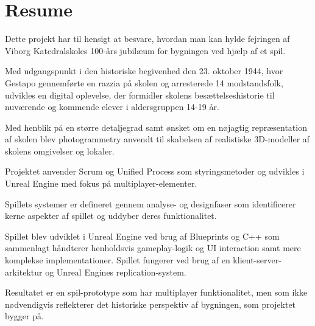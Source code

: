     \section{Resume}

    \begin{itshape}
    Dette projekt har til hensigt at besvare, hvordan man kan hylde fejringen af Viborg Katedralskoles 100-års jubilæum for bygningen ved hjælp af et spil. 
    
    Med udgangspunkt i den historiske begivenhed den 23. oktober 1944, hvor Gestapo gennemførte en razzia på skolen og arresterede 14 modstandsfolk, udvikles en digital oplevelse, der formidler skolens besættelseshistorie til nuværende og kommende elever i aldersgruppen 14-19 år. 
    
    Med henblik på en større detaljegrad samt ønsket om en nøjagtig repræsentation af skolen blev photogrammetry anvendt til skabelsen af realistiske 3D-modeller af skolens omgivelser og lokaler. 

    Projektet anvender Scrum og Unified Process som styringsmetoder og udvikles i Unreal Engine med fokus på multiplayer-elementer. 
    
    Spillets systemer er defineret gennem analyse- og designfaser som identificerer kerne aspekter af spillet og uddyber deres funktionalitet. 

    Spillet blev udviklet i Unreal Engine ved brug af Blueprints og C++ som sammenlagt håndterer henholdsvis gameplay-logik og UI interaction samt mere komplekse implementationer.  Spillet fungerer ved brug af en klient-server-arkitektur og Unreal Engines replication-system. 

    Resultatet er en spil-prototype som har multiplayer funktionalitet, men som ikke nødvendigvis reflekterer det historiske perspektiv af bygningen, som projektet bygger på. 
   \end{itshape}